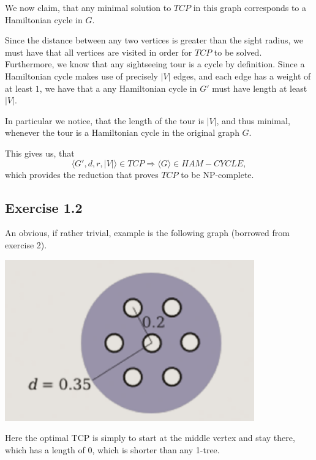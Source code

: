 \documentclass[11pt,a4paper]{article}
\begin{document}
We now claim, that any minimal solution to $TCP$ in this graph corresponds to
a Hamiltonian cycle in $G$.

Since the distance between any two vertices is greater than the sight radius,
we must have that all vertices are visited in order for $TCP$ to be solved.
Furthermore, we know that any sightseeing tour is a cycle by definition. Since a
Hamiltonian cycle makes use of precisely $|V|$ edges, and each edge has a weight of
at least $1$, we have that a any Hamiltonian cycle in $G'$ must have length at least $|V|$.

In particular we notice, that the length of the tour is $|V|$, and thus minimal,
whenever the tour is a Hamiltonian cycle in the original graph $G$.

This gives us, that
\[
    \langle G', d, r, |V| \rangle \in TCP \Rightarrow \langle G \rangle \in HAM-CYCLE,
\]
which provides the reduction that proves $TCP$ to be NP-complete.

\subsection{Exercise 1.2}
An obvious, if rather trivial, example is the following graph (borrowed from exercise 2).

\includegraphics[width=\textwidth]{tcp.png}

Here the optimal TCP is simply to start at the middle vertex and stay there, which has a length of 0, which is shorter than any 1-tree.
\end{document}
